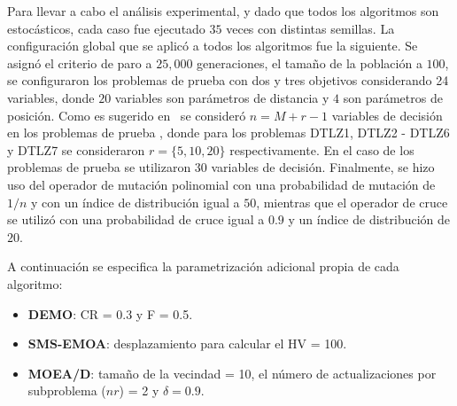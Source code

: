 Para llevar a cabo el análisis experimental, y dado que todos los algoritmos son estocásticos, cada caso fue ejecutado $35$ 
veces con distintas semillas.
%
La configuración global que se aplicó a todos los algoritmos fue la siguiente.
%
Se asignó el criterio de paro a $25,000$ generaciones, el tamaño de la población a $100$, 
se configuraron los problemas de prueba \WFG{} con dos y tres objetivos considerando 24 variables, 
donde $20$ variables son parámetros de distancia y $4$ son parámetros de posición.
%
Como es sugerido en~\cite{Joel:DTLZ_2} se consideró $n=M+r-1$ variables de decisión en los problemas de prueba \DTLZ{}, 
donde para los problemas DTLZ1, DTLZ2 - DTLZ6 y DTLZ7 se consideraron $r=\{5, 10, 20\}$  respectivamente.
% 
En el caso de los problemas de prueba \UF{} se utilizaron $30$ variables de decisión.
%
Finalmente, se hizo uso del operador de mutación polinomial con una probabilidad de mutación de $1/n$ y con un índice de distribución igual a $50$, 
mientras que el operador de cruce \SBX{} se utilizó con una probabilidad de cruce igual a $0.9$ y un índice de distribución de $20$.

A continuación se especifica la parametrización adicional propia de cada algoritmo:
\begin{itemize}
\item \textbf{DEMO}: CR = 0.3 y F = 0.5.
\item \textbf{SMS-EMOA}: desplazamiento para calcular el HV = 100.
\item \textbf{MOEA/D}: tamaño de la vecindad = 10, el número de actualizaciones por subproblema ($nr$) = 2 y $\delta = 0.9$.
\end{itemize}

